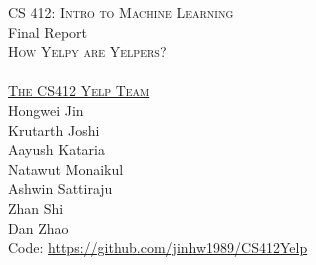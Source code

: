 \begin{titlepage}
\begin{center}

\quad\vspace{5em}


\textsc{\Large CS 412: Intro to Machine Learning}\\
Final Report\\[2cm]

\textsc{\Huge How Yelpy are Yelpers?}\\[1cm]

\\[1cm]

\underline{\textsc{\Large The CS412 Yelp Team}}\\
Hongwei Jin\\Krutarth Joshi\\Aayush Kataria\\
Natawut Monaikul\\Ashwin Sattiraju\\Zhan Shi\\Dan Zhao\\[1cm]
\vspace*{5cm}
Code: \url{https://github.com/jinhw1989/CS412Yelp}
\begin{comment}
\textsc{\Large Hongwei Jin}\\
\textsc{\Large Krutarth Joshi}\\
\textsc{\Large Aayush Kataria}\\
\textsc{\Large Natawut Monaikul}\\
\textsc{\Large Ashwin Sattiraju}\\
\textsc{\Large Zhan Shi}\\
\textsc{\Large Dan Zhao}\\
\end{comment}


\vfill



\end{center}
\end{titlepage}